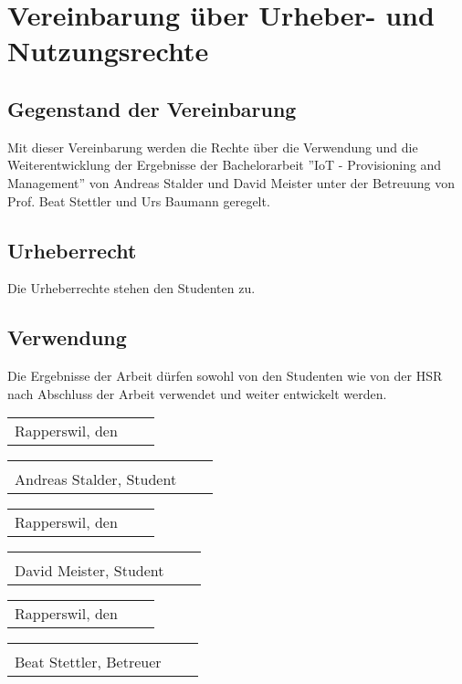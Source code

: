\chapter*{Vereinbarung über Urheber- und Nutzungsrechte}
\section*{Gegenstand der Vereinbarung}
Mit dieser Vereinbarung werden die Rechte über die Verwendung und die Weiterentwicklung der Ergebnisse der Bachelorarbeit ''IoT - Provisioning and Management'' von Andreas Stalder und David Meister unter der Betreuung von Prof. Beat Stettler und Urs Baumann geregelt.
\section*{Urheberrecht}
Die Urheberrechte stehen den Studenten zu.
\section*{Verwendung}
Die Ergebnisse der Arbeit dürfen sowohl von den Studenten wie von der HSR nach Abschluss der Arbeit verwendet und weiter entwickelt werden.

\vspace{1,6 cm} 
\begin{tabular}{p{7cm}p{.5cm}l}
Rapperswil, den\dotfill
\end{tabular}%
\hfill 
\begin{tabular}{p{7cm}p{.5cm}l}
\dotfill \\ 
Andreas Stalder, Student
\end{tabular}

\vspace{1 cm} 
\begin{tabular}{p{7cm}p{.5cm}l}
Rapperswil, den\dotfill
\end{tabular}%
\hfill 
\begin{tabular}{p{7cm}p{.5cm}l}
\dotfill \\ 
David Meister, Student
\end{tabular}

\vspace{1 cm} 
\begin{tabular}{p{7cm}p{.5cm}l}
Rapperswil, den\dotfill
\end{tabular}%
\hfill 
\begin{tabular}{p{7cm}p{.5cm}l}
\dotfill \\ 
Beat Stettler, Betreuer
\end{tabular}

